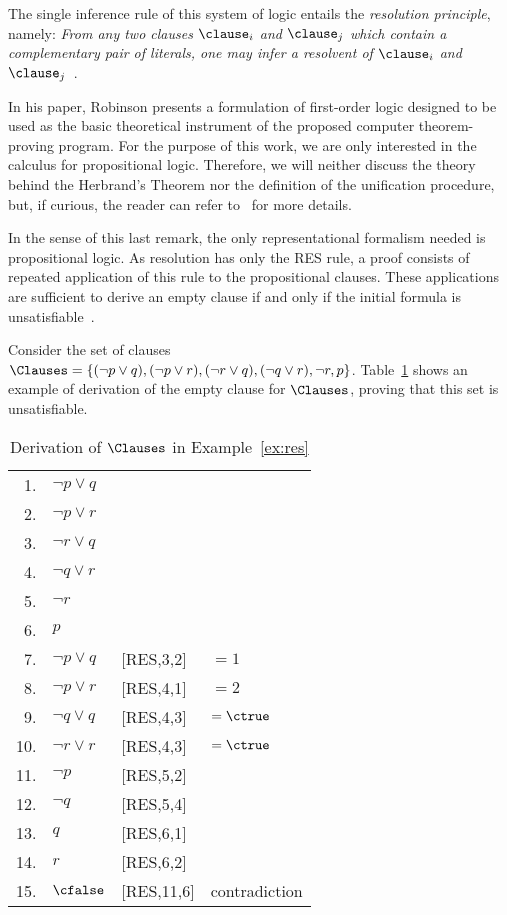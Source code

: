 The single inference rule of this system of logic entails the \emph{resolution
principle}, namely: \emph{From any two clauses} $\clause_i$ \emph{and}
$\clause_j$ \emph{which contain a complementary pair of literals, one may infer
a resolvent of} $\clause_i$ \emph{and} $\clause_j$~\cite{Robinson65}.   

In his paper, Robinson presents a formulation of first-order logic designed to
be used as the basic theoretical instrument of the proposed computer
theorem-proving program. For the purpose of this work, we are only interested in
the calculus for propositional logic. Therefore, we will neither discuss the theory
behind the Herbrand's Theorem nor the definition of the unification procedure,
but, if curious, the reader can refer to~\cite{Robinson65} for more details.

In the sense of this last remark, the only representational formalism needed is
propositional logic. As resolution has only the RES rule, a proof consists of
repeated application of this rule to the propositional clauses. These
applications are sufficient to derive an empty clause if and only if the initial
formula is unsatisfiable~\cite{satchapter}.

\begin{example}%
\label{ex:res}
    Consider the set of clauses $\Clauses = \{(\neg p \lor q), (\neg p \lor r),
    (\neg r \lor q), (\neg q \lor r), \neg r, p\}$. Table~\ref{tab:res} shows an
    example of derivation of the empty clause for $\Clauses$, proving that this
    set is unsatisfiable.

    \begin{table}%
    \caption{Derivation of $\Clauses$ in Example~\ref{ex:res}}
        \centering
        \begin{tabular}{rlll}
            1. & $\neg p \lor q$ & & \\
            2. & $\neg p \lor r$ & & \\
            3. & $\neg r \lor q$ & & \\
            4. & $\neg q \lor r$ & & \\
            5. & $\neg r$ & & \\
            6. & $p$ & & \\
            7. & $\neg p \lor q$ & [RES,3,2] & $= 1$\\
            8. & $\neg p \lor r$ & [RES,4,1] & $= 2$\\
            9. & $\neg q \lor q$ & [RES,4,3] & $= \ctrue$\\
            10.&  $\neg r \lor r$ & [RES,4,3] & $= \ctrue$\\
            11.&  $\neg p$ & [RES,5,2] & \\
            12.&  $\neg q$ & [RES,5,4] & \\
            13.&  $q$ & [RES,6,1] & \\
            14.&  $r$ & [RES,6,2] & \\
            15.&  $\cfalse$ & [RES,11,6] & contradiction\\
        \end{tabular}%
    \label{tab:res}
    \end{table}
\end{example}

